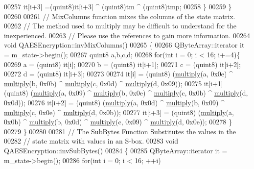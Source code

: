 \begin{DoxyCode}
00257     it[i+3] =(quint8)it[i+3] ^ (quint8)tm ^ (quint8)tmp;
00258   \}
00259 \}
00260 
00261 \textcolor{comment}{// MixColumns function mixes the columns of the state matrix.}
00262 \textcolor{comment}{// The method used to multiply may be difficult to understand for the inexperienced.}
00263 \textcolor{comment}{// Please use the references to gain more information.}
00264 \textcolor{keywordtype}{void} QAESEncryption::invMixColumns()
00265 \{
00266   QByteArray::iterator it = m\_state->begin();
00267   quint8 a,b,c,d;
00268   \textcolor{keywordflow}{for}(\textcolor{keywordtype}{int} i = 0; i < 16; i+=4)\{
00269     a = (quint8) it[i];
00270     b = (quint8) it[i+1];
00271     c = (quint8) it[i+2];
00272     d = (quint8) it[i+3];
00273 
00274     it[i]   = (quint8) (\hyperlink{qaesencryption_8cpp_adcc23c7a5520793f14710fff6ef23dfe}{multiply}(a, 0x0e) ^ \hyperlink{qaesencryption_8cpp_adcc23c7a5520793f14710fff6ef23dfe}{multiply}(b, 0x0b) ^ 
      \hyperlink{qaesencryption_8cpp_adcc23c7a5520793f14710fff6ef23dfe}{multiply}(c, 0x0d) ^ \hyperlink{qaesencryption_8cpp_adcc23c7a5520793f14710fff6ef23dfe}{multiply}(d, 0x09));
00275     it[i+1] = (quint8) (\hyperlink{qaesencryption_8cpp_adcc23c7a5520793f14710fff6ef23dfe}{multiply}(a, 0x09) ^ \hyperlink{qaesencryption_8cpp_adcc23c7a5520793f14710fff6ef23dfe}{multiply}(b, 0x0e) ^ 
      \hyperlink{qaesencryption_8cpp_adcc23c7a5520793f14710fff6ef23dfe}{multiply}(c, 0x0b) ^ \hyperlink{qaesencryption_8cpp_adcc23c7a5520793f14710fff6ef23dfe}{multiply}(d, 0x0d));
00276     it[i+2] = (quint8) (\hyperlink{qaesencryption_8cpp_adcc23c7a5520793f14710fff6ef23dfe}{multiply}(a, 0x0d) ^ \hyperlink{qaesencryption_8cpp_adcc23c7a5520793f14710fff6ef23dfe}{multiply}(b, 0x09) ^ 
      \hyperlink{qaesencryption_8cpp_adcc23c7a5520793f14710fff6ef23dfe}{multiply}(c, 0x0e) ^ \hyperlink{qaesencryption_8cpp_adcc23c7a5520793f14710fff6ef23dfe}{multiply}(d, 0x0b));
00277     it[i+3] = (quint8) (\hyperlink{qaesencryption_8cpp_adcc23c7a5520793f14710fff6ef23dfe}{multiply}(a, 0x0b) ^ \hyperlink{qaesencryption_8cpp_adcc23c7a5520793f14710fff6ef23dfe}{multiply}(b, 0x0d) ^ 
      \hyperlink{qaesencryption_8cpp_adcc23c7a5520793f14710fff6ef23dfe}{multiply}(c, 0x09) ^ \hyperlink{qaesencryption_8cpp_adcc23c7a5520793f14710fff6ef23dfe}{multiply}(d, 0x0e));
00278   \}
00279 \}
00280 
00281 \textcolor{comment}{// The SubBytes Function Substitutes the values in the}
00282 \textcolor{comment}{// state matrix with values in an S-box.}
00283 \textcolor{keywordtype}{void} QAESEncryption::invSubBytes()
00284 \{
00285     QByteArray::iterator it = m\_state->begin();
00286     \textcolor{keywordflow}{for}(\textcolor{keywordtype}{int} i = 0; i < 16; ++i)

\end{DoxyCode}

